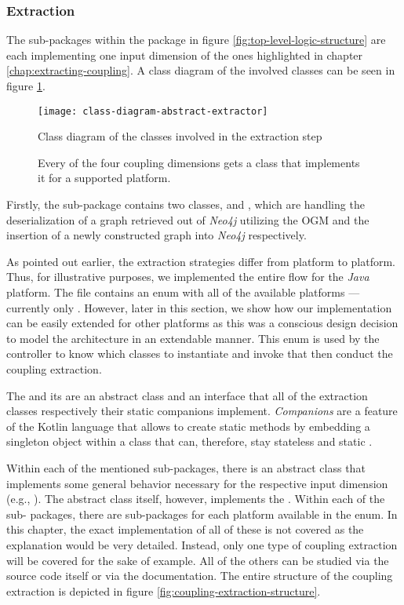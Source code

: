 \documentclass[12pt,a4paper]{report}
\begin{document}
\subsubsection{Extraction}
The sub-packages within the package 
in figure \ref{fig:top-level-logic-structure} are each
implementing one input dimension of the ones highlighted in chapter
\ref{chap:extracting-coupling}.
A class diagram of the involved classes can be seen in
figure \ref{fig:class-diagram-abstract-extractor}.

\begin{figure}[htbp]
\centering
\texttt{[image: class-diagram-abstract-extractor]}
\caption{Class diagram of the classes involved in the extraction step}
\caption*{\centering
  Every of the four coupling dimensions gets a class that implements it
  for a supported platform.
}
\label{fig:class-diagram-abstract-extractor}
\end{figure}

Firstly, the sub-package  contains two classes,  and , which are handling the
deserialization of a graph retrieved out of \textit{Neo4j} utilizing the OGM
and the insertion of a newly constructed graph into \textit{Neo4j}
respectively.

As pointed out earlier, the extraction strategies differ from platform to
platform. Thus, for illustrative purposes, we implemented the entire flow for
the \textit{Java} platform. The  file contains an enum with
all of the available platforms --- currently only . However, later
in this section, we show how our implementation can be easily extended for
other platforms as this was a conscious design decision to model the
architecture in an extendable manner. This enum is used by the controller to
know which classes to instantiate and invoke that then conduct the coupling
extraction.

The  and its  are an
abstract class and an interface that all of the extraction classes respectively
their static companions implement. \textit{Companions} are a feature of the
Kotlin language that allows to create static methods by embedding a singleton
object within a class that can, therefore, stay stateless and static
\cite{kotlin-companions}.

Within each of the mentioned sub-packages, there is an abstract class that
implements some general behavior necessary for the respective input dimension
(e.g., ). The abstract class itself,
however, implements the . Within each of the sub\hyp
packages, there are sub-packages for each platform available in the  enum. In this chapter, the exact implementation of all of these is
not covered as the explanation would be very detailed. Instead, only one type
of coupling extraction will be covered for the sake of example. All of the
others can be studied via the source code itself or via the documentation.
The entire structure of the coupling extraction is depicted in figure
\ref{fig:coupling-extraction-structure}.
\end{document}
